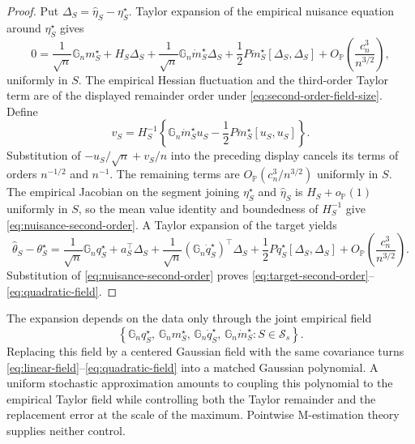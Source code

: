 \documentclass[a4paper,10pt,english]{article}
\newcommand{\Prob}{\mathbb P}
\begin{document}
\begin{proof}
Put $\Delta_S=\hat\eta_S-\eta_S^\star$.  Taylor expansion of the empirical
nuisance equation around $\eta_S^\star$ gives
\begin{equation*}
 0=\frac1{\sqrt n}\mathbb G_nm_S^\star
   +H_S\Delta_S
   +\frac1{\sqrt n}\mathbb G_n\dot m_S^\star\Delta_S
   +\frac12P\ddot m_S^\star[\Delta_S,\Delta_S]
   +O_{\Prob}\left(\frac{c_n^3}{n^{3/2}}\right),
\end{equation*}
uniformly in $S$.
The empirical Hessian fluctuation and the third-order Taylor term are of
the displayed remainder order under \eqref{eq:second-order-field-size}.
Define
\begin{equation*}
 v_S=H_S^{-1}\left\{
       \mathbb G_n\dot m_S^\star u_S
       -\frac12P\ddot m_S^\star[u_S,u_S]\right\}.
\end{equation*}
Substitution of $-u_S/\sqrt n+v_S/n$ into the preceding display cancels
its terms of orders $n^{-1/2}$ and $n^{-1}$.  The remaining terms are
$O_{\Prob}(c_n^3/n^{3/2})$ uniformly in $S$.  The empirical Jacobian on
the segment joining $\eta_S^\star$ and $\hat\eta_S$ is
$H_S+o_{\Prob}(1)$ uniformly in $S$, so the mean value identity and
boundedness of $H_S^{-1}$ give \eqref{eq:nuisance-second-order}.  A Taylor
expansion of the target yields
\begin{equation*}
 \hat\theta_S-\theta_S^\star
 =\frac1{\sqrt n}\mathbb G_nq_S^\star
  +a_S^\top\Delta_S
  +\frac1{\sqrt n}(\mathbb G_n\dot q_S^\star)^\top\Delta_S
  +\frac12P\ddot q_S^\star[\Delta_S,\Delta_S]
  +O_{\Prob}\left(\frac{c_n^3}{n^{3/2}}\right).
\end{equation*}
Substitution of \eqref{eq:nuisance-second-order} proves
\eqref{eq:target-second-order}--\eqref{eq:quadratic-field}.
\end{proof}

The expansion depends on the data only through the joint empirical field
\begin{equation}\label{eq:joint-empirical-field}
 \left\{\mathbb G_nq_S^\star,\,
 \mathbb G_nm_S^\star,\,
 \mathbb G_n\dot q_S^\star,\,
 \mathbb G_n\dot m_S^\star:S\in\mathcal S_s\right\}.
\end{equation}
Replacing this field by a centered Gaussian field with the same covariance
turns \eqref{eq:linear-field}--\eqref{eq:quadratic-field} into a matched
Gaussian polynomial.  A uniform stochastic approximation amounts to
coupling this polynomial to the empirical Taylor field while controlling
both the Taylor remainder and the replacement error at the scale of the
maximum.  Pointwise M-estimation theory supplies neither control.
\end{document}
